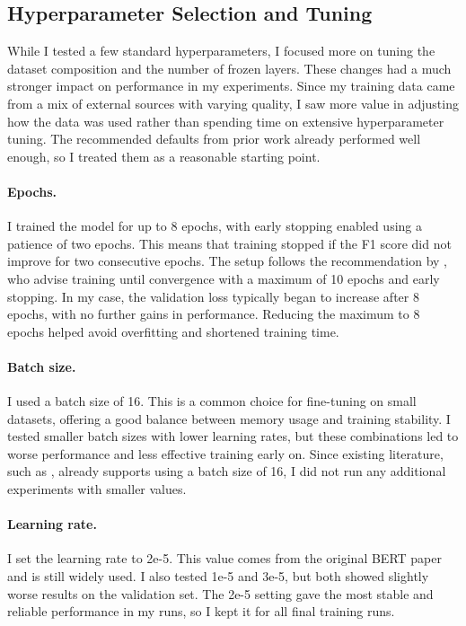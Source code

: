 \subsection{Hyperparameter Selection and Tuning} \label{subsection:hyperparameter_tuning_methodology}
     While I tested a few standard hyperparameters, I focused more on tuning the dataset composition and the number of frozen layers. These changes had a much stronger impact on performance in my experiments. Since my training data came from a mix of external sources with varying quality, I saw more value in adjusting how the data was used rather than spending time on extensive hyperparameter tuning. The recommended defaults from prior work already performed well enough, so I treated them as a reasonable starting point.

    \paragraph{Epochs.} I trained the model for up to 8 epochs, with early stopping enabled using a patience of two epochs. This means that training stopped if the F1 score did not improve for two consecutive epochs. The setup follows the recommendation by \textcite{pecherComparingSpecialisedSmall2024}, who advise training until convergence with a maximum of 10 epochs and early stopping. In my case, the validation loss typically began to increase after 8 epochs, with no further gains in performance. Reducing the maximum to 8 epochs helped avoid overfitting and shortened training time.

    \paragraph{Batch size.} I used a batch size of 16. This is a common choice for fine-tuning on small datasets, offering a good balance between memory usage and training stability. I tested smaller batch sizes with lower learning rates, but these combinations led to worse performance and less effective training early on. Since existing literature, such as \textcite{mosbachStabilityFinetuningBERT2021}, already supports using a batch size of 16, I did not run any additional experiments with smaller values.

    \paragraph{Learning rate.} I set the learning rate to 2e-5. This value comes from the original BERT paper \parencite{devlinBERTPretrainingDeep2019} and is still widely used. I also tested 1e-5 and 3e-5, but both showed slightly worse results on the validation set. The 2e-5 setting gave the most stable and reliable performance in my runs, so I kept it for all final training runs.

